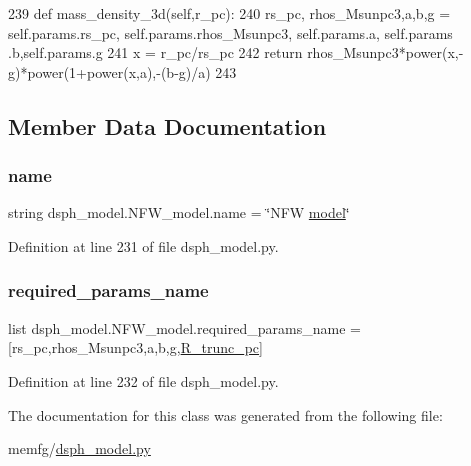 \begin{DoxyCode}
239     \textcolor{keyword}{def }mass\_density\_3d(self,r\_pc):
240         rs\_pc, rhos\_Msunpc3,a,b,g = self.params.rs\_pc, self.params.rhos\_Msunpc3, self.params.a, self.params
      .b,self.params.g
241         x = r\_pc/rs\_pc
242         \textcolor{keywordflow}{return} rhos\_Msunpc3*power(x,-g)*power(1+power(x,a),-(b-g)/a)
243         
\end{DoxyCode}


\subsection{Member Data Documentation}
\mbox{\label{classdsph__model_1_1NFW__model_a5cf6e836f1d377ae4d7e0708c109b8cb}} 
\subsubsection{\texorpdfstring{name}{name}}
{\footnotesize\ttfamily string dsph\+\_\+model.\+N\+F\+W\+\_\+model.\+name = \char`\"{}N\+FW \hyperlink{classdsph__model_1_1model}{model}\char`\"{}\hspace{0.3cm}{\ttfamily [static]}}



Definition at line 231 of file dsph\+\_\+model.\+py.

\mbox{\label{classdsph__model_1_1NFW__model_ae08a05fd1593c131b89e7da6d228abb4}} 
\subsubsection{\texorpdfstring{required\+\_\+params\+\_\+name}{required\_params\_name}}
{\footnotesize\ttfamily list dsph\+\_\+model.\+N\+F\+W\+\_\+model.\+required\+\_\+params\+\_\+name = \mbox{[}\textquotesingle{}rs\+\_\+pc\textquotesingle{},\textquotesingle{}rhos\+\_\+\+Msunpc3\textquotesingle{},\textquotesingle{}a\textquotesingle{},\textquotesingle{}b\textquotesingle{},\textquotesingle{}g\textquotesingle{},\textquotesingle{}\hyperlink{namespacedsph__model_a03ec56ecf56f64e59a6be020a76a36f1}{R\+\_\+trunc\+\_\+pc}\textquotesingle{}\mbox{]}\hspace{0.3cm}{\ttfamily [static]}}



Definition at line 232 of file dsph\+\_\+model.\+py.



The documentation for this class was generated from the following file\+:\begin{DoxyCompactItemize}
\item 
memfg/\hyperlink{dsph__model_8py}{dsph\+\_\+model.\+py}\end{DoxyCompactItemize}
